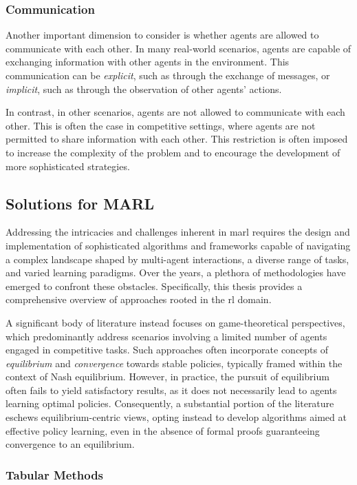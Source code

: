 \subsubsection{Communication}
Another important dimension to consider is whether agents are allowed to communicate with each other. 
 In many real-world scenarios, agents are capable of exchanging information with other agents in the environment. 
 This communication can be \emph{explicit}, 
 such as through the exchange of messages, or \emph{implicit}, 
 such as through the observation of other agents' actions. 

In contrast, in other scenarios, agents are not allowed to communicate with each other. 
 This is often the case in competitive settings, 
 where agents are not permitted to share information with each other. 
 This restriction is often imposed to increase the complexity of the problem and to encourage the development of more sophisticated strategies.

\subsection{Solutions for MARL}
Addressing the intricacies and challenges inherent in \ac{marl} requires the design and implementation of sophisticated algorithms 
 and frameworks capable of navigating a complex landscape shaped by multi-agent interactions, 
 a diverse range of tasks, and varied learning paradigms. 
%
Over the years, a plethora of methodologies have emerged to confront these obstacles. 
 Specifically, this thesis provides a comprehensive overview of approaches rooted in the \ac{rl} domain.

A significant body of literature instead focuses on game-theoretical perspectives, 
 which predominantly address scenarios involving a limited number of agents engaged in competitive tasks. 
 Such approaches often incorporate concepts of \emph{equilibrium} and \emph{convergence} towards stable policies, 
 typically framed within the context of Nash equilibrium.
%
However, in practice, the pursuit of equilibrium often fails to yield satisfactory results, 
 as it does not necessarily lead to agents learning optimal policies. 
 Consequently, a substantial portion of the literature eschews equilibrium-centric views, 
 opting instead to develop algorithms aimed at effective policy learning, 
 even in the absence of formal proofs guaranteeing convergence to an equilibrium.

 \subsubsection{Tabular Methods}

